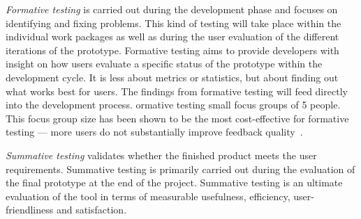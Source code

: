 \textit{Formative testing} is carried out during the development phase and focuses on identifying and fixing problems. This kind of testing will take place within the individual work packages as well as during the user evaluation of the different iterations of the prototype. Formative testing aims to provide developers with insight on how users evaluate a specific status of the prototype within the development cycle. It is less about metrics or statistics, but about finding out what works best for users. The findings from formative testing will feed directly into the development process. ormative testing   small focus groups of  5 people.
This focus group size has been shown to be the most cost-effective for formative testing --- more users do not substantially improve feedback quality~\citep{neilson2000}.

\textit{Summative testing} validates whether the finished product meets the user requirements. Summative testing is primarily carried out during the evaluation of the final prototype at the end of the project. Summative testing is an ultimate evaluation of the tool in terms of measurable usefulness, efficiency, user-friendliness and satisfaction.


